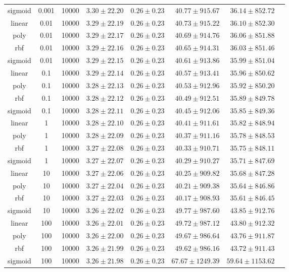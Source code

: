 \begin{tabular}{cccrrrrr}
sigmoid & 0.001 & 10000 & $3.30 \pm 22.20$ & $0.26 \pm 0.23$ & $40.77 \pm 915.67$ & $36.14 \pm 852.72$\\
linear & 0.01 & 10000 & $3.29 \pm 22.19$ & $0.26 \pm 0.23$ & $40.73 \pm 915.22$ & $36.10 \pm 852.30$\\
poly & 0.01 & 10000 & $3.29 \pm 22.17$ & $0.26 \pm 0.23$ & $40.69 \pm 914.76$ & $36.06 \pm 851.88$\\
rbf & 0.01 & 10000 & $3.29 \pm 22.16$ & $0.26 \pm 0.23$ & $40.65 \pm 914.31$ & $36.03 \pm 851.46$\\
sigmoid & 0.01 & 10000 & $3.29 \pm 22.15$ & $0.26 \pm 0.23$ & $40.61 \pm 913.86$ & $35.99 \pm 851.04$\\
linear & 0.1 & 10000 & $3.29 \pm 22.14$ & $0.26 \pm 0.23$ & $40.57 \pm 913.41$ & $35.96 \pm 850.62$\\
poly & 0.1 & 10000 & $3.28 \pm 22.13$ & $0.26 \pm 0.23$ & $40.53 \pm 912.96$ & $35.92 \pm 850.20$\\
rbf & 0.1 & 10000 & $3.28 \pm 22.12$ & $0.26 \pm 0.23$ & $40.49 \pm 912.51$ & $35.89 \pm 849.78$\\
sigmoid & 0.1 & 10000 & $3.28 \pm 22.11$ & $0.26 \pm 0.23$ & $40.45 \pm 912.06$ & $35.85 \pm 849.36$\\
linear & 1 & 10000 & $3.28 \pm 22.10$ & $0.26 \pm 0.23$ & $40.41 \pm 911.61$ & $35.82 \pm 848.94$\\
poly & 1 & 10000 & $3.28 \pm 22.09$ & $0.26 \pm 0.23$ & $40.37 \pm 911.16$ & $35.78 \pm 848.53$\\
rbf & 1 & 10000 & $3.27 \pm 22.08$ & $0.26 \pm 0.23$ & $40.33 \pm 910.71$ & $35.75 \pm 848.11$\\
sigmoid & 1 & 10000 & $3.27 \pm 22.07$ & $0.26 \pm 0.23$ & $40.29 \pm 910.27$ & $35.71 \pm 847.69$\\
linear & 10 & 10000 & $3.27 \pm 22.06$ & $0.26 \pm 0.23$ & $40.25 \pm 909.82$ & $35.68 \pm 847.28$\\
poly & 10 & 10000 & $3.27 \pm 22.04$ & $0.26 \pm 0.23$ & $40.21 \pm 909.38$ & $35.64 \pm 846.86$\\
rbf & 10 & 10000 & $3.27 \pm 22.03$ & $0.26 \pm 0.23$ & $40.17 \pm 908.93$ & $35.61 \pm 846.45$\\
sigmoid & 10 & 10000 & $3.26 \pm 22.02$ & $0.26 \pm 0.23$ & $49.77 \pm 987.60$ & $43.85 \pm 912.76$\\
linear & 100 & 10000 & $3.26 \pm 22.01$ & $0.26 \pm 0.23$ & $49.72 \pm 987.12$ & $43.80 \pm 912.32$\\
poly & 100 & 10000 & $3.26 \pm 22.00$ & $0.26 \pm 0.23$ & $49.67 \pm 986.64$ & $43.76 \pm 911.87$\\
rbf & 100 & 10000 & $3.26 \pm 21.99$ & $0.26 \pm 0.23$ & $49.62 \pm 986.16$ & $43.72 \pm 911.43$\\
sigmoid & 100 & 10000 & $3.26 \pm 21.98$ & $0.26 \pm 0.23$ & $67.67 \pm 1249.39$ & $59.64 \pm 1153.62$\\
\bottomrule
\end{tabular}
